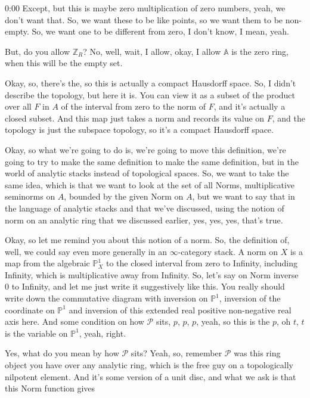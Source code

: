 \begin{unfinished}{0:00}
Except, but this is maybe zero multiplication of zero numbers, yeah, we don't want that. So, we want these to be like points, so we want them to be non-empty. So, we want one to be different from zero, I don't know, I mean, yeah.

But, do you allow $\mathbb{Z}_R$? No, well, wait, I allow, okay, I allow $\mathbb{A}$ is the zero ring, when this will be the empty set.

Okay, so, there's the, so this is actually a compact Hausdorff space. So, I didn't describe the topology, but here it is. You can view it as a subset of the product over all $F$ in $A$ of the interval from zero to the norm of $F$, and it's actually a closed subset. And this map just takes a norm and records its value on $F$, and the topology is just the subspace topology, so it's a compact Hausdorff space.

Okay, so what we're going to do is, we're going to move this definition, we're going to try to make the same definition to make the same definition, but in the world of analytic stacks instead of topological spaces. So, we want to take the same idea, which is that we want to look at the set of all Norms, multiplicative seminorms on $A$, bounded by the given Norm on $A$, but we want to say that in the language of analytic stacks and that we've discussed, using the notion of norm on an analytic ring that we discussed earlier, yes, yes, yes, that's true.

Okay, so let me remind you about this notion of a norm. So, the definition of, well, we could say even more generally in an $\infty$-category stack. A norm on $X$ is a map from the algebraic $\mathbb{P}^1_X$ to the closed interval from zero to Infinity, including Infinity, which is multiplicative away from Infinity. So, let's say on Norm inverse $0$ to Infinity, and let me just write it suggestively like this. You really should write down the commutative diagram with inversion on $\mathbb{P}^1$, inversion of the coordinate on $\mathbb{P}^1$ and inversion of this extended real positive non-negative real axis here. And some condition on how $\mathcal{P}$ sits, $p$, $p$, $p$, yeah, so this is the $p$, oh $t$, $t$ is the variable on $\mathbb{P}^1$, yeah, right.

Yes, what do you mean by how $\mathcal{P}$ sits? Yeah, so, remember $\mathcal{P}$ was this ring object you have over any analytic ring, which is the free guy on a topologically nilpotent element. And it's some version of a unit disc, and what we ask is that this Norm function gives


\end{unfinished}
